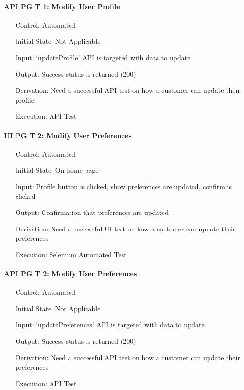 \documentclass[12pt, titlepage]{article}
\begin{document}
\paragraph*{API PG T 1: Modify User Profile}
\begin{itemize}
	\item[Control:] Automated
	\item[Initial State:] Not Applicable
	\item[Input:] `updateProfile' API is targeted with data to update
	\item[Output:] Success status is returned (200)
	\item[Derivation:] Need a successful API test on how a customer can update their profile
	\item[Execution:] API Test
\end{itemize}

\paragraph*{UI PG T 2: Modify User Preferences}
\begin{itemize}
	\item[Control:] Automated
	\item[Initial State:] On home page
	\item[Input:] Profile button is clicked, show preferences are updated, confirm is clicked
	\item[Output:] Confirmation that preferences are updated
	\item[Derivation:] Need a successful UI test on how a customer can update their preferences
	\item[Execution:] Selenium Automated Test
\end{itemize}

\paragraph*{API PG T 2: Modify User Preferences}
\begin{itemize}
	\item[Control:] Automated
	\item[Initial State:] Not Applicable
	\item[Input:] `updatePreferences' API is targeted with data to update
	\item[Output:] Success status is returned (200)
	\item[Derivation:] Need a successful API test on how a customer can update their preferences
	\item[Execution:] API Test
\end{itemize}
\end{document}
